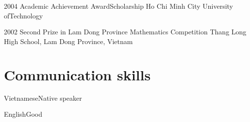 \documentclass{tccv}
\begin{document}
\begin{yearlist}

\item{2004}
    {Academic Achievement Award\newline Scholarship}
    {Ho Chi Minh City University of\newline Technology}

\item{2002}
    {Second Prize in Lam Dong Province Mathematics Competition}
    {Thang Long High School, Lam Dong Province, Vietnam}

\end{yearlist}

\section{Communication skills}

\begin{factlist}
\item{Vietnamese}{Native speaker}
\item{English}{Good}
\end{factlist}
\end{document}
